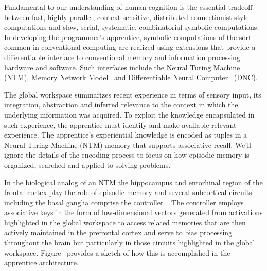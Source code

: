 
Fundamental to our understanding of human cognition is the essential tradeoff between fast, highly-parallel, context-sensitive, distributed connectionist-style computations and slow, serial, systematic, combinatorial symbolic computations. In developing the programmer's apprentice, symbolic computations of the sort common in conventional computing are realized using extensions that provide a differentiable interface to conventional memory and information processing hardware and software. Such interfaces include the Neural Turing Machine~\cite{GravesetalCoRR-14} (NTM), Memory Network Model~\cite{WestonetalCoRR-14,SukhbaataretalCoRR-15} and Differentiable Neural Computer~\cite{GravesetalNATURE-16} (DNC).

The global workspace summarizes recent experience in terms of sensory input, its integration, abstraction and inferred relevance to the context in which the underlying information was acquired. To exploit the knowledge encapsulated in such experience, the apprentice must identify and make available relevant experience. The apprentice’s experiential knowledge is encoded as tuples in a Neural Turing Machine (NTM) memory that supports associative recall. We’ll ignore the details of the encoding process to focus on how episodic memory is organized, searched and applied to solving problems.

In the biological analog of an NTM the hippocampus and entorhinal region of the frontal cortex play the role of episodic memory and several subcortical circuits including the basal ganglia comprise the controller~\cite{OReillyetalLEABRA-16,OReillySCIENCE-06}. The controller employs associative keys in the form of low-dimensional vectors generated from activations highlighted in the global workspace to access related memories that are then actively maintained in the prefrontal cortex and serve to bias processing throughout the brain but particularly in those circuits highlighted in the global workspace. Figure~{} provides a sketch of how this is accomplished in the apprentice architecture. 



\setcounter{figure}{51}



